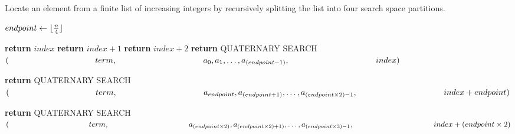 \documentclass[a4paper, 12pt]{article}
\DeclarePairedDelimiter{\floor}{\lfloor}{\rfloor}
\begin{document}
	
	\begin{algorithm}

		\renewcommand{\thealgorithm}{3.1.28}
		
		\caption{Locate an element from a finite list of increasing integers by recursively splitting the list into four search space partitions.}
		
		\begin{algorithmic}[1]
			
			
			\State $endpoint \gets \floor{\frac{n}{4}}$
			
			 
					\State \textbf{return} $index$
					\State \textbf{return} $index + 1$
				\Else
					\State \textbf{return} $index + 2$
				\EndIf
			 
				\State \textbf{return} QUATERNARY SEARCH$(\newline \indent \indent \indent \indent \indent \indent \indent term, \newline \indent \indent \indent \indent \indent \indent \indent a_0, a_1, \dots, a_{(endpoint-1)},\newline \indent \indent \indent \indent \indent \indent \indent index)$
				
				\State \textbf{return} QUATERNARY SEARCH$(\newline \indent \indent \indent \indent \indent \indent \indent term,\newline \indent \indent \indent \indent \indent \indent \indent a_{endpoint}, a_{(endpoint+1)}, \dots, a_{(endpoint \times 2)-1}, \newline \indent \indent \indent \indent \indent \indent \indent index + endpoint)$
				
				\State \textbf{return} QUATERNARY SEARCH$(\newline \indent \indent \indent \indent \indent \indent \indent term,\newline \indent \indent \indent \indent \indent \indent \indent a_{(endpoint \times 2)}, a_{(endpoint \times 2)+1)}, \dots, a_{(endpoint \times 3)-1}, \newline \indent \indent \indent \indent \indent \indent \indent index + (endpoint \times 2)$
				

\end{algorithmic}
\end{algorithm}
\end{document}
